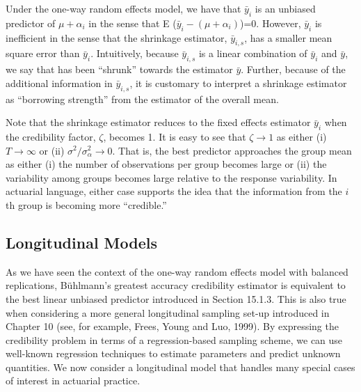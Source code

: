 \linejed

Under the one-way random effects model, we have that $\bar{y}_i$ is
an unbiased predictor of $\mu+\alpha_i$ in the sense that E
($\bar{y}_i - (\mu+\alpha_i)$)=0. However, $\bar{y}_i$ is
inefficient in the sense that the shrinkage estimator,
$\bar{y}_{i,s}$, has a smaller mean square error than $\bar{y}_i$.
Intuitively, because $\bar{y}_{i,s}$  is a linear combination of
$\bar{y}_i$  and $\bar{y}$, we say that has been ``shrunk'' towards
the estimator $\bar{y}$. Further, because of the additional
information in $\bar{y}_{i,s}$, it is customary to interpret a
shrinkage estimator as ``borrowing strength'' from the estimator of
the overall mean.

Note that the shrinkage estimator reduces to the fixed effects
estimator $\bar{y}_i$  when the credibility factor, $\zeta$, becomes
1. It is easy to see that $\zeta \rightarrow 1$ as either (i)
$T\rightarrow\infty$ or (ii) $\sigma^2/\sigma^2_{\alpha}\rightarrow
0$. That is, the best predictor approaches the group mean as either
(i) the number of observations per group becomes large or (ii) the
variability among groups becomes large relative to the response
variability. In actuarial language, either case supports the idea
that the information from the $i$th group is becoming more
``credible.''

\subsection{Longitudinal Models}

As we have seen the context of the one-way random effects model with
balanced replications, B\"{u}hlmann's greatest accuracy credibility
estimator is equivalent to the best linear unbiased predictor
introduced in Section 15.1.3. This is also true when considering a
more general longitudinal sampling set-up introduced in Chapter 10
(see, for example, Frees, Young and Luo, 1999). By expressing the
credibility problem in terms of a regression-based sampling scheme,
we can use well-known regression techniques to estimate parameters
and predict unknown quantities. We now consider a longitudinal model
that handles many special cases of interest in actuarial practice.

